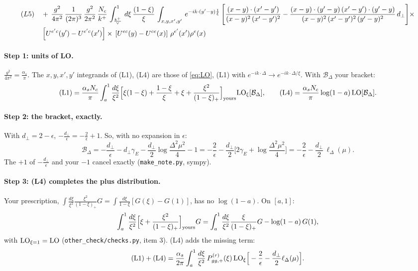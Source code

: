\documentclass[10pt]{article}
\numberwithin{equation}{section}
\newcommand{\LO}{{\rm LO}}
\begin{document}
\begin{align}
(L5)\quad& +\,\frac{g^{2}}{4\pi^{2}}\, \frac{1}{(2\pi)^{3}}\,\frac{g^{2}}{2\pi^{2}}\, \frac{N_{c}}{k^{+}}\,\int_{\frac{k^{+}}{\vee}}^{1}\,d\xi\, \frac{(1-\xi)}{\xi}\, \int_{x,y,x',y'}\,e^{-ik\cdot (y'-y)\frac{1}{\xi}}\,\Bigg[\frac{(x-y)\cdot (x'-y')}{(x-y)^{2}\, (x'-y')^{2}} -\frac{(x-y)\cdot (y'-y)\, (x'-y')\cdot (y'-y)}{(x-y)^{2}\,(x'-y')^{2}\,(y'-y)^{2}}\,d_{\perp}\Bigg]\times\notag \\ &  \left[U^{e'c}(y') - U^{e'c}(x')\right] \times\, \left[U^{ec}(y) - U^{ce}(x)\right]\, \rho^{e'}(x') \rho^{e}(x)
\end{align}

\paragraph{Step 1: units of LO.} $\frac{g^2}{4\pi^2}=\frac{\alpha_s}{\pi}$. The $x,y,x',y'$ integrands of (L1), (L4) are those of \eqref{eq:LO}, (L1) with $e^{-ik\cdot\Delta}\to e^{-ik\cdot\Delta/\xi}$. With $\mathcal B_\Delta$ your bracket:
\begin{equation}
({\rm L1})=\frac{\alpha_sN_c}{\pi}\int_a^1\frac{d\xi}{\xi^2}\Big[\xi(1-\xi)+\frac{1-\xi}{\xi}+\xi+\frac{\xi^2}{(1-\xi)_+}\Big]_{\rm yours}\LO_\xi[\mathcal B_\Delta],\qquad
({\rm L4})=\frac{\alpha_sN_c}{\pi}\log(1-a)\,\LO[\mathcal B_\Delta].
\end{equation}

\paragraph{Step 2: the bracket, exactly.} With $d_\perp=2-\epsilon$, $-\frac{d_\perp}{\epsilon}=-\frac{2}{\epsilon}+1$. So, with no expansion in $\epsilon$:
\begin{equation}
\mathcal B_\Delta=-\frac{d_\perp}{\epsilon}-d_\perp\gamma_E-\frac{d_\perp}{2}\log\frac{\Delta^2\mu^2}{4}-1=-\frac{2}{\epsilon}-\frac{d_\perp}{2}\Big[2\gamma_E+\log\frac{\Delta^2\mu^2}{4}\Big]=-\frac2\epsilon-\frac{d_\perp}{2}\,\ell_\Delta(\mu).\label{eq:B}
\end{equation}
The $+1$ of $-\frac{d_\perp}{\epsilon}$ and your $-1$ cancel exactly (\texttt{make\_note.py}, sympy).

\paragraph{Step 3: (L4) completes the plus distribution.} Your prescription, $\int\frac{d\xi}{\xi^2}\frac{\xi^2}{(1-\xi)_+}G=\int\frac{d\xi}{1-\xi}[G(\xi)-G(1)]$, has no $\log(1-a)$. On $[a,1]$:
\begin{equation*}
\int_a^1\frac{d\xi}{\xi^2}\Big[\xi+\frac{\xi^2}{(1-\xi)_+}\Big]_{\rm yours}G=\int_a^1\frac{d\xi}{\xi^2}\frac{\xi}{(1-\xi)_+}G-\log(1-a)\,G(1),
\end{equation*}
with $\LO_{\xi=1}=\LO$ (\texttt{other\_check/checks.py}, item 3). (L4) adds the missing term:
\begin{equation}
({\rm L1})+({\rm L4})=\frac{\alpha_s}{2\pi}\int_a^1\frac{d\xi}{\xi^2}\,P^{(r)}_{gg,+}(\xi)\,\LO_\xi\Big[-\frac2\epsilon-\frac{d_\perp}{2}\ell_\Delta(\mu)\Big].\label{eq:L14}
\end{equation}
\end{document}

